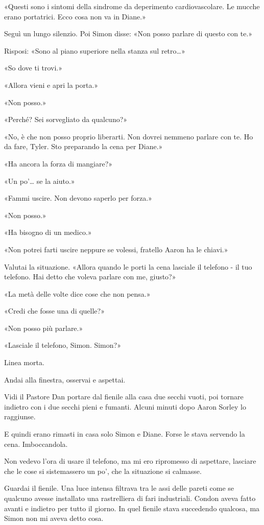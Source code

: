 «Questi sono i sintomi della sindrome da deperimento cardiovascolare. Le
mucche erano portatrici. Ecco cosa non va in Diane.»

Seguì un lungo silenzio. Poi Simon disse: «Non posso parlare di questo
con te.»

Risposi: «Sono al piano superiore nella stanza sul retro\ldots»

«So dove ti trovi.»

«Allora vieni e apri la porta.»

«Non posso.»

«Perché? Sei sorvegliato da qualcuno?»

«No, è che non posso proprio liberarti. Non dovrei nemmeno parlare con
te. Ho da fare, Tyler. Sto preparando la cena per Diane.»

«Ha ancora la forza di mangiare?»

«Un po'\ldots{} se la aiuto.»

«Fammi uscire. Non devono saperlo per forza.»

«Non posso.»

«Ha bisogno di un medico.»

«Non potrei farti uscire neppure se volessi, fratello Aaron ha le
chiavi.»

Valutai la situazione. «Allora quando le porti la cena lasciale il
telefono - il tuo telefono. Hai detto che voleva parlare con me,
giusto?»

«La metà delle volte dice cose che non pensa.»

«Credi che fosse una di quelle?»

«Non posso più parlare.»

«Lasciale il telefono, Simon. Simon?»

Linea morta.

\separatorefiori

Andai alla finestra, osservai e aspettai.

Vidi il Pastore Dan portare dal fienile alla casa due secchi vuoti, poi
tornare indietro con i due secchi pieni e fumanti. Alcuni minuti dopo
Aaron Sorley lo raggiunse.

E quindi erano rimasti in casa solo Simon e Diane. Forse le stava
servendo la cena. Imboccandola.

Non vedevo l'ora di usare il telefono, ma mi ero ripromesso di
aspettare, lasciare che le cose si sistemassero un po', che la
situazione si calmasse.

Guardai il fienile. Una luce intensa filtrava tra le assi delle pareti
come se qualcuno avesse installato una rastrelliera di fari industriali.
Condon aveva fatto avanti e indietro per tutto il giorno. In quel
fienile stava succedendo qualcosa, ma Simon non mi aveva detto cosa.

